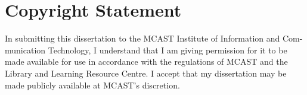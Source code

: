 \newpage

\chapter*{\centering Copyright Statement}
\vspace{-0.2in}

\begin{spacing}{1.5}
\setlength{\parskip}{0.3in}
\setlength{\parindent}{0in}


In submitting this dissertation to the MCAST Institute of Information and Com-
munication Technology, I understand that I am giving permission for it to be
made available for use in accordance with the regulations of MCAST and the
Library and Learning Resource Centre. I accept that my dissertation may be
made publicly available at MCAST’s discretion.

\vspace{2.5cm}

\begin{center}
	\makebox[4cm]{\dotfill}  \hfill \makebox[4cm]{\dotfill}\\
	      \hfill {}
\end{center}
\end{spacing}
\newpage
